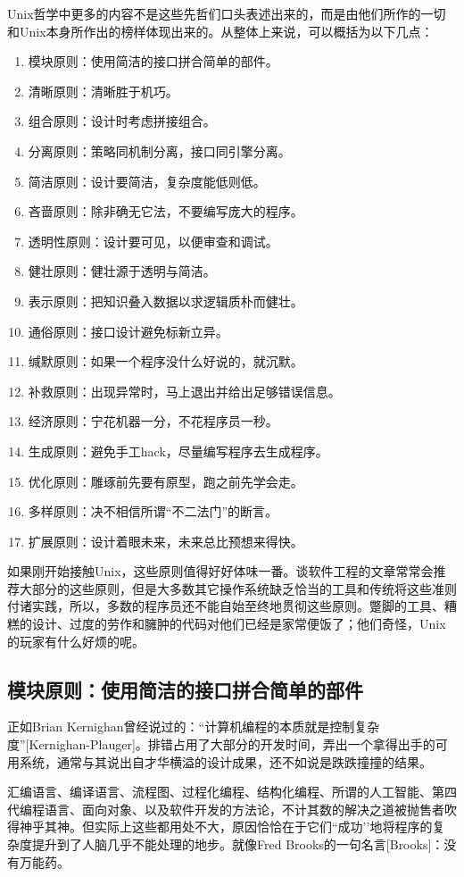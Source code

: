 \documentclass[11pt,oneside]{book}
\begin{document}
\begin{common-format}
Unix哲学中更多的内容不是这些先哲们口头表述出来的，而是由他们所作的一切和Unix本身所作出的榜样体现出来的。从整体上来说，可以概括为以下几点：
\begin{enumerate}
\item 模块原则：使用简洁的接口拼合简单的部件。
\item 清晰原则：清晰胜于机巧。
\item 组合原则：设计时考虑拼接组合。
\item 分离原则：策略同机制分离，接口同引擎分离。
\item 简洁原则：设计要简洁，复杂度能低则低。
\item 吝啬原则：除非确无它法，不要编写庞大的程序。
\item 透明性原则：设计要可见，以便审查和调试。
\item 健壮原则：健壮源于透明与简洁。
\item 表示原则：把知识叠入数据以求逻辑质朴而健壮。
\item 通俗原则：接口设计避免标新立异。
\item 缄默原则：如果一个程序没什么好说的，就沉默。
\item 补救原则：出现异常时，马上退出并给出足够错误信息。
\item 经济原则：宁花机器一分，不花程序员一秒。
\item 生成原则：避免手工hack，尽量编写程序去生成程序。
\item 优化原则：雕琢前先要有原型，跑之前先学会走。
\item 多样原则：决不相信所谓“不二法门”的断言。
\item 扩展原则：设计着眼未来，未来总比预想来得快。
\end{enumerate}

如果刚开始接触Unix，这些原则值得好好体味一番。谈软件工程的文章常常会推荐大部分的这些原则，但是大多数其它操作系统缺乏恰当的工具和传统将这些准则付诸实践，所以，多数的程序员还不能自始至终地贯彻这些原则。蹩脚的工具、糟糕的设计、过度的劳作和臃肿的代码对他们已经是家常便饭了；他们奇怪，Unix的玩家有什么好烦的呢。


\subsection{模块原则：使用简洁的接口拼合简单的部件}
正如Brian Kernighan曾经说过的：“计算机编程的本质就是控制复杂度”[Kernighan-Plauger]。排错占用了大部分的开发时间，弄出一个拿得出手的可用系统，通常与其说出自才华横溢的设计成果，还不如说是跌跌撞撞的结果。

汇编语言、编译语言、流程图、过程化编程、结构化编程、所谓的人工智能、第四代编程语言、面向对象、以及软件开发的方法论，不计其数的解决之道被抛售者吹得神乎其神。但实际上这些都用处不大，原因恰恰在于它们“成功’’地将程序的复杂度提升到了人脑几乎不能处理的地步。就像Fred Brooks的一句名言[Brooks]：没有万能药。


\end{common-format}
\end{document}

